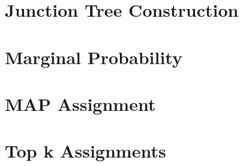 \documentclass[12pt]{article}
\begin{document}
\section{Junction Tree Construction}
\section{Marginal Probability}
\section{MAP Assignment}
\section{Top k Assignments}
\end{document}

